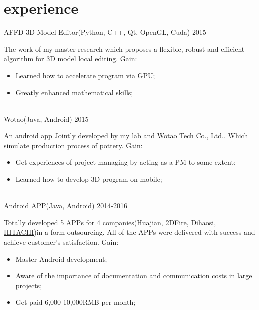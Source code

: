 \documentclass[]{friggeri-cv} %
\begin{document}
\section{experience}
\begin{entrylist}
\entryact
{AFFD 3D Model Editor(Python, C++, Qt, OpenGL, Cuda)}
{2015}
{The work of my master research which proposes a flexible, robust and efficient algorithm for 3D model local editing. Gain:
\begin{itemize}
    \item Learned how to accelerate program via GPU;
    \item Greatly enhanced mathematical skills;
\end{itemize}}
\\
\entryact
{Wotao(Java, Android)}
{2015}
{An android app Jointly developed by my lab and \href{http://wowtao.me/index.html}{Wotao Tech Co., Ltd.}. Which simulate production process of pottery. Gain:
\begin{itemize}
    \item Get experiences of project managing by acting as a PM to some extent;
    \item Learned how to develop 3D program on mobile;
\end{itemize}}
\\
\entryact
{Android APP(Java, Android)}
{2014-2016}
{Totally developed 5 APPs for 4 companies(\href{http://www.hjtechcn.cn/}{Huajian}, \href{http://www.2dfire.com/}{2DFire}, \href{http://d-controls.com/}{Dihaosi}, \href{http://www.hisensehitachi.com/}{HITACHI})in a form outsourcing. All of the APPs were delivered with success and achieve customer's satisfaction. Gain:
\begin{itemize}
    \item Master Android development;
    \item Aware of the importance of documentation and communication costs in large projects;
    \item Get paid 6,000-10,000RMB per month;
\end{itemize}}

\end{entrylist}
\end{document}
